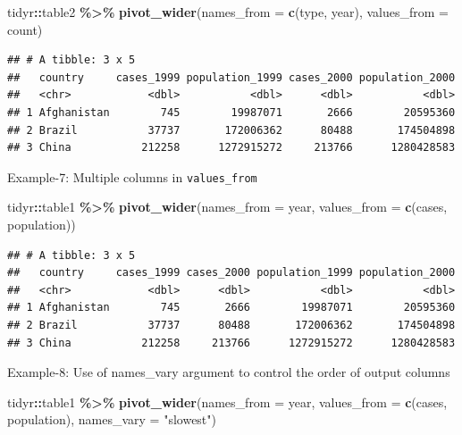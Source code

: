 \documentclass[
]{book}
\newenvironment{Shaded}{\begin{snugshade}}{\end{snugshade}}
\newcommand{\AttributeTok}[1]{\textcolor[rgb]{0.13,0.29,0.53}{#1}}
\newcommand{\FunctionTok}[1]{\textcolor[rgb]{0.13,0.29,0.53}{\textbf{#1}}}
\newcommand{\NormalTok}[1]{#1}
\newcommand{\SpecialCharTok}[1]{\textcolor[rgb]{0.81,0.36,0.00}{\textbf{#1}}}
\newcommand{\StringTok}[1]{\textcolor[rgb]{0.31,0.60,0.02}{#1}}
\begin{document}
\begin{Shaded}
\begin{Highlighting}[]
\NormalTok{tidyr}\SpecialCharTok{::}\NormalTok{table2 }\SpecialCharTok{\%\textgreater{}\%} 
  \FunctionTok{pivot\_wider}\NormalTok{(}\AttributeTok{names\_from =} \FunctionTok{c}\NormalTok{(type, year),}
               \AttributeTok{values\_from =}\NormalTok{ count)}
\end{Highlighting}
\end{Shaded}

\begin{verbatim}
## # A tibble: 3 x 5
##   country     cases_1999 population_1999 cases_2000 population_2000
##   <chr>            <dbl>           <dbl>      <dbl>           <dbl>
## 1 Afghanistan        745        19987071       2666        20595360
## 2 Brazil           37737       172006362      80488       174504898
## 3 China           212258      1272915272     213766      1280428583
\end{verbatim}

Example-7: Multiple columns in \texttt{values\_from}

\begin{Shaded}
\begin{Highlighting}[]
\NormalTok{tidyr}\SpecialCharTok{::}\NormalTok{table1 }\SpecialCharTok{\%\textgreater{}\%} 
  \FunctionTok{pivot\_wider}\NormalTok{(}\AttributeTok{names\_from =}\NormalTok{ year,}
              \AttributeTok{values\_from =} \FunctionTok{c}\NormalTok{(cases, population))}
\end{Highlighting}
\end{Shaded}

\begin{verbatim}
## # A tibble: 3 x 5
##   country     cases_1999 cases_2000 population_1999 population_2000
##   <chr>            <dbl>      <dbl>           <dbl>           <dbl>
## 1 Afghanistan        745       2666        19987071        20595360
## 2 Brazil           37737      80488       172006362       174504898
## 3 China           212258     213766      1272915272      1280428583
\end{verbatim}

Example-8: Use of names\_vary argument to control the order of output columns

\begin{Shaded}
\begin{Highlighting}[]
\NormalTok{tidyr}\SpecialCharTok{::}\NormalTok{table1 }\SpecialCharTok{\%\textgreater{}\%} 
  \FunctionTok{pivot\_wider}\NormalTok{(}\AttributeTok{names\_from =}\NormalTok{ year,}
              \AttributeTok{values\_from =} \FunctionTok{c}\NormalTok{(cases, population),}
              \AttributeTok{names\_vary =} \StringTok{"slowest"}\NormalTok{)}
\end{Highlighting}
\end{Shaded}
\end{document}
